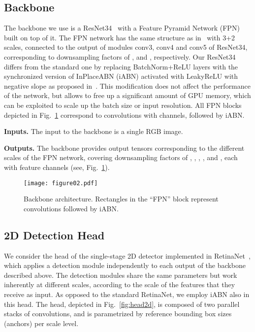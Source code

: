 \documentclass[10pt,twocolumn,letterpaper]{article}
\newcommand{\iABNsync}{iABN\xspace}
\newcommand{\convx}[1]{\textrm{conv#1}}
\renewcommand{\paragraph}[1]{

        \vspace{3pt}
	\noindent\textbf{#1}}
\begin{document}
\subsection{Backbone}
The backbone we use is a ResNet34~\cite{He2015b} with a Feature Pyramid Network (FPN)~\cite{Lin2016} built on top of it. The FPN network has the same structure as in~\cite{Lin+17} with 3+2 scales, connected to the output of modules \convx3, \convx4 and \convx5 of ResNet34, corresponding to downsampling factors of ,  and , respectively. Our ResNet34 differs from the standard one by replacing BatchNorm+ReLU layers with the synchronized version of InPlaceABN (\iABNsync) activated with LeakyReLU with negative slope  as proposed in~\cite{RotPorKon18a}. This modification does not affect the performance of the network, but allows to free up a significant amount of GPU memory, which can be exploited to scale up the batch size or input resolution. All FPN blocks depicted in Fig.~\ref{fig:backbone} correspond to  convolutions with  channels, followed by \iABNsync.

\paragraph{Inputs.}
The input  to the backbone is a single RGB image.

\paragraph{Outputs.}
The backbone provides  output tensors  corresponding to the  different scales of the FPN network, covering downsampling factors of , , , , and , each with  feature channels (see, Fig.~\ref{fig:backbone}).


\begin{figure}[th]
    \centering
    \texttt{[image: figure02.pdf]}
    \caption{Backbone architecture. Rectangles in the ``FPN'' block represent convolutions followed by \iABNsync.}
    \label{fig:backbone}
    \vspace{-12pt}
\end{figure}

\subsection{2D Detection Head}
\label{sec:head2D}
We consider the head of the single-stage 2D detector implemented in RetinaNet~\cite{Lin+17}, which applies a detection module independently to each output  of the backbone described above. The detection modules share the same parameters but work inherently at different scales, according to the scale of the features that they receive as input. As opposed to the standard RetinaNet, we employ \iABNsync also in this head.
The head, depicted in Fig.~\ref{fig:head2d}, is composed of two parallel stacks of  convolutions, and is parametrized by  reference bounding box sizes (anchors) per scale level.
\end{document}
